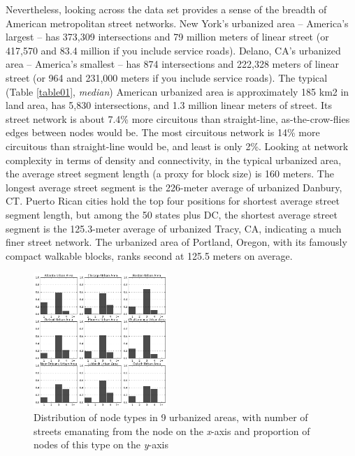 \documentclass[Afour,sageh,times]{sage/sagej}
\begin{document}
Nevertheless, looking across the data set provides a sense of the breadth of American metropolitan street networks. New York's urbanized area – America's largest – has 373,309 intersections and 79 million meters of linear street (or 417,570 and 83.4 million if you include service roads). Delano, CA's urbanized area – America's smallest – has 874 intersections and 222,328 meters of linear street (or 964 and 231,000 meters if you include service roads). The typical (Table \ref{table01}, \emph{median}) American urbanized area is approximately 185 km2 in land area, has 5,830 intersections, and 1.3 million linear meters of street. Its street network is about 7.4\% more circuitous than straight-line, as-the-crow-flies edges between nodes would be. The most circuitous network is 14\% more circuitous than straight-line would be, and least is only 2\%. Looking at network complexity in terms of density and connectivity, in the typical urbanized area, the average street segment length (a proxy for block size) is 160 meters. The longest average street segment is the 226-meter average of urbanized Danbury, CT. Puerto Rican cities hold the top four positions for shortest average street segment length, but among the 50 states plus DC, the shortest average street segment is the 125.3-meter average of urbanized Tracy, CA, indicating a much finer street network. The urbanized area of Portland, Oregon, with its famously compact walkable blocks, ranks second at 125.5 meters on average.

\begin{figure}
\includegraphics[width=0.45\textwidth]{media/fig02.png}
\caption{Distribution of node types in 9 urbanized areas, with number of streets emanating from the node on the \emph{x}-axis and proportion of nodes of this type on the \emph{y}-axis }
\label{fig02}
\end{figure}
\end{document}
